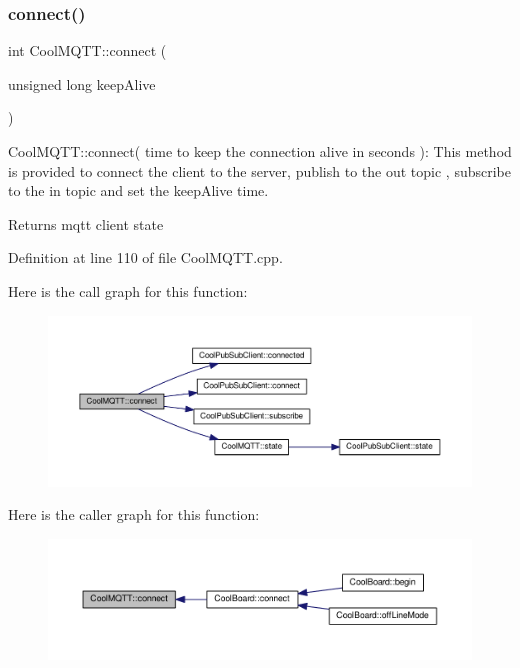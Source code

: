 \subsubsection{\texorpdfstring{connect()}{connect()}}
{\footnotesize\ttfamily int Cool\+M\+Q\+T\+T\+::connect (\begin{DoxyParamCaption}\item[{unsigned long}]{keep\+Alive }\end{DoxyParamCaption})}

Cool\+M\+Q\+T\+T\+::connect( time to keep the connection alive in seconds )\+: This method is provided to connect the client to the server, publish to the out topic , subscribe to the in topic and set the keep\+Alive time.

\begin{DoxyReturn}{Returns}
mqtt client state 
\end{DoxyReturn}


Definition at line 110 of file Cool\+M\+Q\+T\+T.\+cpp.

Here is the call graph for this function\+:
\nopagebreak
\begin{figure}[H]
\begin{center}
\leavevmode
\includegraphics[width=350pt]{class_cool_m_q_t_t_a50075d0ab23a327ab897fd6adad20eda_cgraph}
\end{center}
\end{figure}
Here is the caller graph for this function\+:
\nopagebreak
\begin{figure}[H]
\begin{center}
\leavevmode
\includegraphics[width=350pt]{class_cool_m_q_t_t_a50075d0ab23a327ab897fd6adad20eda_icgraph}
\end{center}
\end{figure}
\mbox{\label{class_cool_m_q_t_t_a373cc92fca7760d886f02d8a6e5b3f63}} 
